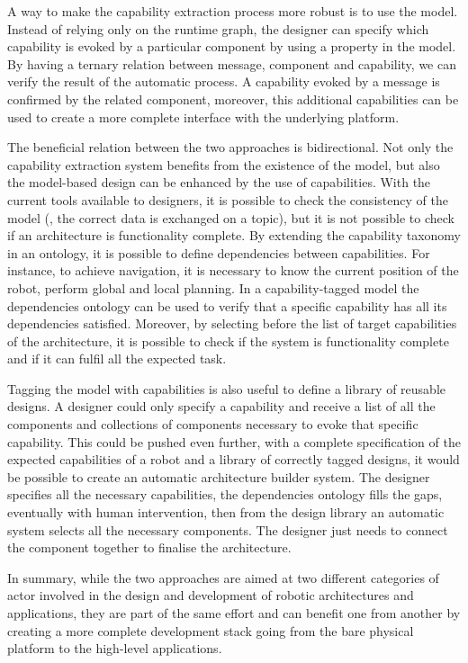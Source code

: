 A way to make the capability extraction process more robust is to use the model. Instead of relying only on the runtime graph, the designer can specify which capability is evoked by a particular component by using a property in the model. By having a ternary relation between message, component and capability, we can verify the result of the automatic process. A capability evoked by a message is confirmed by the related component, moreover, this additional capabilities can be used to create a more complete interface with the underlying platform.

The beneficial relation between the two approaches is bidirectional. Not only the capability extraction system benefits from the existence of the model, but also the model-based design can be enhanced by the use of capabilities. With the current tools available to designers, it is possible to check the consistency of the model (\eg, the correct data is exchanged on a topic), but it is not possible to check if an architecture is functionality complete. By extending the capability taxonomy in an ontology, it is possible to define dependencies between capabilities. For instance, to achieve navigation, it is necessary to know the current position of the robot, perform global and local planning. In a capability-tagged model the dependencies ontology can be used to verify that a specific capability has all its dependencies satisfied. Moreover, by selecting before the list of target capabilities of the architecture, it is possible to check if the system is functionality complete and if it can fulfil all the expected task.

Tagging the model with capabilities is also useful to define a library of reusable designs. A designer could only specify a capability and receive a list of all the components and collections of components necessary to evoke that specific capability. This could be pushed even further, with a complete specification of the expected capabilities of a robot and a library of correctly tagged designs, it would be possible to create an automatic architecture builder system. The designer specifies all the necessary capabilities, the dependencies ontology fills the gaps, eventually with human intervention, then from the design library an automatic system selects all the necessary components. The designer just needs to connect the component together to finalise the architecture.

In summary, while the two approaches are aimed at two different categories of actor involved in the design and development of robotic architectures and applications, they are part of the same effort and can benefit one from another by creating a more complete development stack going from the bare physical platform to the high-level applications. 




